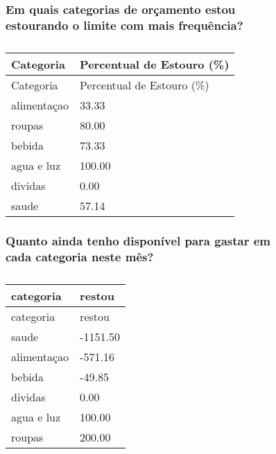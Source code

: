 \documentclass[
  8pt,
  a4paper,
  DIV=11,
  numbers=noendperiod]{scrartcl}
\begin{document}
\begin{figure}

\begin{minipage}{0.50\linewidth}

\subsubsection{Em quais categorias de orçamento estou estourando o
limite com mais
frequência?}\label{em-quais-categorias-de-oruxe7amento-estou-estourando-o-limite-com-mais-frequuxeancia}

\begin{longtable}[]{@{}ll@{}}
\caption{}\label{T_f16ea}\tabularnewline
\toprule\noalign{}
Categoria & Percentual de Estouro (\%) \\
\midrule\noalign{}
\endfirsthead
\toprule\noalign{}
Categoria & Percentual de Estouro (\%) \\
\midrule\noalign{}
\endhead
\bottomrule\noalign{}
\endlastfoot
alimentaçao & 33.33 \\
roupas & 80.00 \\
bebida & 73.33 \\
agua e luz & 100.00 \\
dividas & 0.00 \\
saude & 57.14 \\
\end{longtable}

\end{minipage}%
%
\begin{minipage}{0.50\linewidth}

\subsubsection{Quanto ainda tenho disponível para gastar em cada
categoria neste
mês?}\label{quanto-ainda-tenho-disponuxedvel-para-gastar-em-cada-categoria-neste-muxeas}

\begin{longtable}[]{@{}ll@{}}
\caption{}\label{T_0cb5b}\tabularnewline
\toprule\noalign{}
categoria & restou \\
\midrule\noalign{}
\endfirsthead
\toprule\noalign{}
categoria & restou \\
\midrule\noalign{}
\endhead
\bottomrule\noalign{}
\endlastfoot
saude & -1151.50 \\
alimentaçao & -571.16 \\
bebida & -49.85 \\
dividas & 0.00 \\
agua e luz & 100.00 \\
roupas & 200.00 \\
\end{longtable}

\end{minipage}%

\end{figure}%
\end{document}
